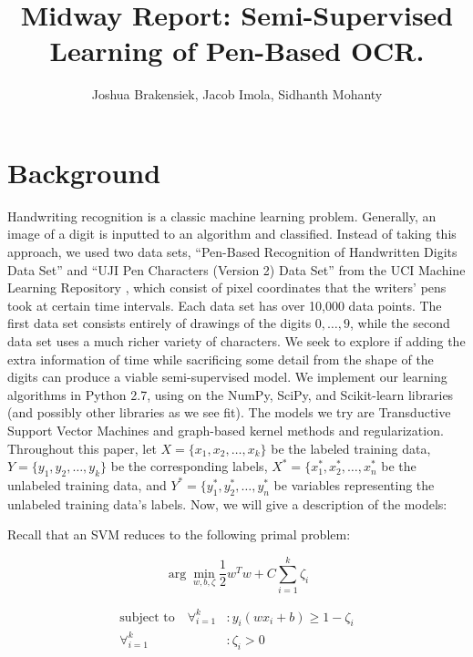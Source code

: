\documentclass[11pt]{article}
\title{Midway Report: Semi-Supervised Learning of Pen-Based OCR.}
\author{Joshua Brakensiek, Jacob Imola, Sidhanth Mohanty}
\begin{document}
\maketitle

\newcommand{\Seq}{\operatorname{Seq}}

\section{Background}

Handwriting recognition is a classic machine learning problem. Generally, an image of a digit is inputted to an algorithm and classified. Instead of taking this approach, we used two data sets,  ``Pen-Based Recognition of Handwritten Digits Data Set'' \cite{Alpaydin:1998} and  ``UJI Pen Characters (Version 2) Data Set'' \cite{Llorens:2008} from the UCI Machine Learning Repository \cite{Lichman:2013}, which consist of pixel coordinates that the writers' pens took at certain time intervals.  Each data set has over 10,000 data points. The first data set consists entirely of drawings of the digits $0, \hdots, 9$, while the second data set uses a much richer variety of characters. We seek to explore if adding the extra information of time while sacrificing some detail from the shape of the digits can produce a viable semi-supervised model.  We implement our learning algorithms in Python 2.7, using on the NumPy, SciPy, and Scikit-learn libraries (and possibly other libraries as we see fit). The models we try are Transductive Support Vector Machines and graph-based kernel methods and regularization. Throughout this paper, let $X = \{x_1, x_2, \ldots, x_k\}$ be the labeled training data, $Y = \{y_1, y_2, \ldots, y_k\}$ be the corresponding labels, $X^* = \{x^*_1, x^*_2, \ldots, x^*_n$ be the unlabeled training data, and $Y^* = \{y^*_1, y^*_2, \ldots, y^*_n$ be variables representing the unlabeled training data's labels. Now, we will give a description of the models: \par

Recall that an SVM reduces to the following primal problem:

\begin{equation}\label{eq:1}
\arg\min_{w, b, \zeta} \frac{1}{2}w^Tw+C\sum_{i=1}^k\zeta_i
\end{equation}

\begin{align*}
\textrm{subject to}\quad \forall_{i=1}^k&: y_i(wx_i+b)\geq 1-\zeta_i \\
\forall_{i=1}^k&: \zeta_i>0
\end{align*}
\end{document}
